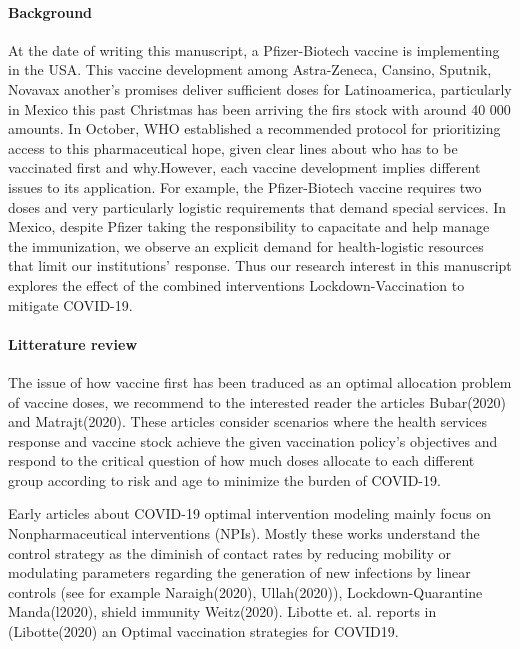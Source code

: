 \paragraph{Background}
         At the date of writing this manuscript, a Pfizer-Biotech vaccine is
    implementing in the USA. This vaccine development among Astra-Zeneca,
    Cansino, Sputnik, Novavax another's promises deliver sufficient doses
    for Latinoamerica, particularly in Mexico this past Christmas has been
    arriving the firs stock with around 40 000 amounts. In October, WHO
    established a recommended protocol for prioritizing access to this
    pharmaceutical hope, given clear lines about who has to be vaccinated first
    and why.However, each vaccine development implies different issues to its
    application. For example, the Pfizer-Biotech vaccine requires two doses and
    very particularly logistic requirements that demand special services. In
    Mexico, despite Pfizer taking the responsibility to capacitate and help
    manage the immunization, we observe an explicit demand for health-logistic
    resources that limit our institutions' response. Thus our research interest
    in this manuscript explores the effect of the combined interventions
    Lockdown-Vaccination to mitigate COVID-19.


\paragraph{Litterature review}
        The issue of how vaccine first has been traduced as an optimal
    allocation problem of vaccine doses, we recommend to the interested reader
    the articles Bubar(2020) and  Matrajt(2020).  These articles consider
    scenarios where the health services response and vaccine stock achieve the
    given vaccination policy's objectives and respond to the critical question
    of how much doses allocate to each different group according to risk and
    age to minimize the burden of COVID-19.

        Early articles about COVID-19 optimal intervention modeling mainly
    focus on Nonpharmaceutical interventions (NPIs). Mostly these works
    understand the control strategy as the diminish of contact rates by
    reducing mobility or modulating parameters regarding the generation of new
    infections by linear controls (see for example Naraigh(2020),
    Ullah(2020)), Lockdown-Quarantine Manda(l2020),  shield immunity
    Weitz(2020). Libotte et. al. reports in (Libotte(2020) an Optimal
    vaccination strategies for COVID19.
